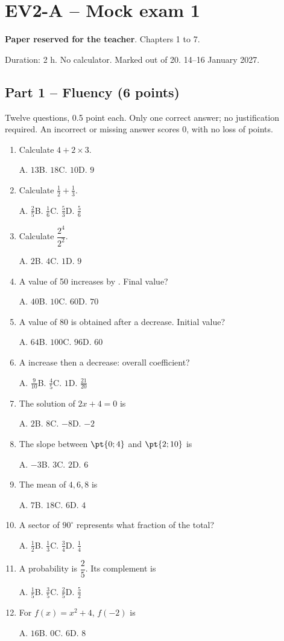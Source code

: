 \mxnewpage\section*{EV2-A -- Mock exam 1}\label{EV2-A}
\textbf{Paper reserved for the teacher}. Chapters 1 to 7.\par Duration: 2 h. No calculator. Marked out of 20. 14--16 January 2027.
\subsection*{Part 1 -- Fluency (6 points)}
Twelve questions, \num{0,5} point each. Only one correct answer; no justification required. An incorrect or missing answer scores 0, with no loss of points.
\begin{enumerate}
\item Calculate $4+2\times3$.\par A. $13$\quad B. $18$\quad C. $10$\quad D. $9$
\item Calculate $\frac12+\frac13$.\par A. $\frac{2}{5}$\quad B. $\frac{1}{6}$\quad C. $\frac{5}{3}$\quad D. $\frac{5}{6}$
\item Calculate $\dfrac{2^4}{2^{2}}$.\par A. $2$\quad B. $4$\quad C. $1$\quad D. $9$
\item A value of 50 increases by . Final value?\par A. $40$\quad B. $10$\quad C. $60$\quad D. $70$
\item A value of 80 is obtained after a  decrease. Initial value?\par A. $64$\quad B. $100$\quad C. $96$\quad D. $60$
\item A  increase then a  decrease: overall coefficient?\par A. $\frac{9}{10}$\quad B. $\frac{4}{5}$\quad C. $1$\quad D. $\frac{21}{20}$
\item The solution of $2x+4=0$ is\par A. $2$\quad B. $8$\quad C. $-8$\quad D. $-2$
\item The slope between $\pt{0;4}$ and $\pt{2;10}$ is\par A. $-3$\quad B. $3$\quad C. $2$\quad D. $6$
\item The mean of $4, 6, 8$ is\par A. $7$\quad B. $18$\quad C. $6$\quad D. $4$
\item A sector of $90^\circ$ represents what fraction of the total?\par A. $\frac{1}{2}$\quad B. $\frac{1}{3}$\quad C. $\frac{3}{4}$\quad D. $\frac{1}{4}$
\item A probability is $\dfrac{2}{5}$. Its complement is\par A. $\frac{1}{5}$\quad B. $\frac{3}{5}$\quad C. $\frac{2}{5}$\quad D. $\frac{5}{2}$
\item For $f(x)=x^2+4$, $f(-2)$ is\par A. $16$\quad B. $0$\quad C. $6$\quad D. $8$
\end{enumerate}
